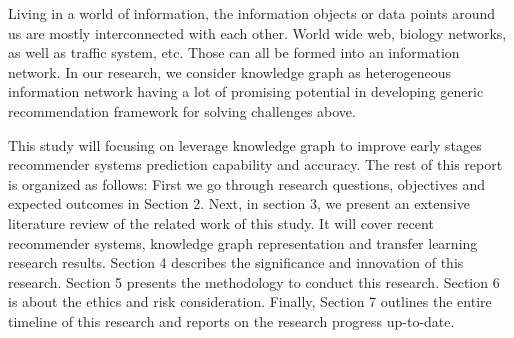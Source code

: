 Living in a world of information, the information objects or data points around us are mostly interconnected with each other. World wide web, biology networks, as well as traffic system, etc. Those can all be formed into an information network. In our research, we consider knowledge graph as heterogeneous information network having a lot of promising potential in developing generic recommendation framework for solving challenges above.

This study will focusing on leverage knowledge graph to improve early stages recommender systems prediction capability and accuracy. The rest of this report is organized as follows: 
First we go through research questions, objectives and expected outcomes in Section 2. Next, in section 3, we present an extensive literature review of the related work of this study. It will cover recent recommender systems, knowledge graph representation and transfer learning research results. Section 4 describes the significance and innovation of this research. Section 5 presents the methodology to conduct this research. Section 6 is about the ethics and risk consideration. Finally, Section 7 outlines the entire timeline of this research and reports on the research progress up-to-date.


